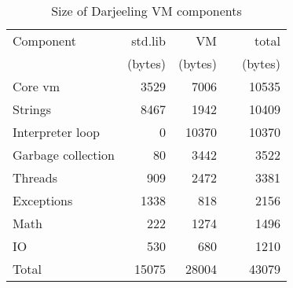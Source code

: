 \begin{table}
\caption{Size of Darjeeling VM components}
\label{tab-vm-size}
    \begin{tabular}{lrrcr} %
    \toprule
    Component             & std.lib                   & VM                   & & total \\
                          & (bytes)                   & (bytes)              & & (bytes)  \\
    \midrule
    \midrule
    Core vm               &  3529                     &  7006                & &           10535 \\
    Strings               &  8467                     &  1942                & &           10409 \\
    Interpreter loop      &     0                     & 10370                & &           10370 \\
    Garbage collection    &    80                     &  3442                & &            3522 \\
    Threads               &   909                     &  2472                & &            3381 \\
    Exceptions            &  1338                     &   818                & &            2156 \\
    Math                  &   222                     &  1274                & &            1496 \\
    IO                    &   530                     &   680                & &            1210 \\
    Total                 & 15075                     & 28004                & &           43079 \\
    \bottomrule
    \end{tabular}
\end{table}
